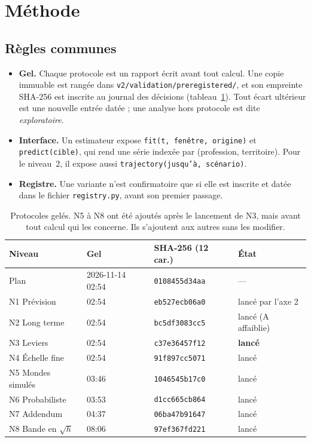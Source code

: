 \section{Méthode}\label{a3-sec:methode}
\subsection{Règles communes}
\begin{itemize}
  \item \textbf{Gel.} Chaque protocole est un rapport écrit avant tout calcul. Une copie immuable est
        rangée dans \texttt{v2/validation/preregistered/}, et son empreinte SHA-256 est inscrite au
        journal des décisions (tableau~\ref{a3-tab:sha}). Tout écart ultérieur est une nouvelle entrée
        datée ; une analyse hors protocole est dite \emph{exploratoire}.
  \item \textbf{Interface.} Un estimateur expose \texttt{fit(t, fenêtre, origine)} et
        \texttt{predict(cible)}, qui rend une série indexée par (profession, territoire). Pour le
        niveau~2, il expose aussi \texttt{trajectory(jusqu'à, scénario)}.
  \item \textbf{Registre.} Une variante n'est confirmatoire que si elle est inscrite et datée
        dans le fichier \texttt{registry.py}, avant son premier passage.
\end{itemize}

\begin{table}[h]
\centering\small
\begin{tabular}{@{}llll@{}}
\toprule
Niveau & Gel & SHA-256 (12 car.) & État \\
\midrule
Plan & 2026-11-14 02:54 & \texttt{0108455d34aa} & --- \\
N1 Prévision & 02:54 & \texttt{eb527ecb06a0} & lancé par l'axe 2 \\
N2 Long terme & 02:54 & \texttt{bc5df3083cc5} & lancé (A affaiblie) \\
N3 Leviers & 02:54 & \texttt{c37e36457f12} & \textbf{lancé} \\
N4 Échelle fine & 02:54 & \texttt{91f897cc5071} & lancé \\
N5 Mondes simulés & 03:46 & \texttt{1046545b17c0} & lancé \\
N6 Probabiliste & 03:53 & \texttt{d1cc665cb864} & lancé \\
N7 Addendum & 04:37 & \texttt{06ba47b91647} & lancé \\
N8 Bande en $\sqrt h$ & 08:06 & \texttt{97ef367fd221} & lancé \\
\bottomrule
\end{tabular}
\caption{Protocoles gelés. N5 à N8 ont été ajoutés après le lancement de N3, mais avant tout
calcul qui les concerne. Ils s'ajoutent aux autres sans les modifier.}\label{a3-tab:sha}
\end{table}

